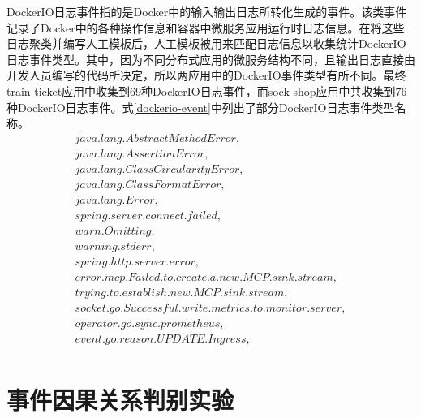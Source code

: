 DockerIO日志事件指的是Docker中的输入输出日志所转化生成的事件。该类事件记录了Docker\cite{boettiger2015introduction}中的各种操作信息和容器中微服务应用运行时日志信息。在将这些日志聚类并编写人工模板后，人工模板被用来匹配日志信息以收集统计DockerIO日志事件类型。其中，因为不同分布式应用的微服务结构不同，且输出日志直接由开发人员编写的代码所决定，所以两应用中的DockerIO事件类型有所不同。最终train-ticket应用中收集到69种DockerIO日志事件，而sock-shop应用中共收集到76种DockerIO日志事件。式\ref{dockerio-event}中列出了部分DockerIO日志事件类型名称。
\begin{equation}
    \begin{array}{l}
        java.lang.AbstractMethodError,\\
        java.lang.AssertionError,\\
        java.lang.ClassCircularityError,\\
        java.lang.ClassFormatError,\\
        java.lang.Error,\\
        spring.server.connect.failed,\\
        warn.Omitting,\\
        warning.stderr,\\
        spring.http.server.error,\\
        error.mcp.Failed.to.create.a.new.MCP.sink.stream,\\
        trying.to.establish.new.MCP.sink.stream,\\
        socket.go.Successful.write.metrics.to.monitor.server,\\
        operator.go.sync.prometheus,\\
        event.go.reason.UPDATE.Ingress,\\
    \end{array}
    \label{dockerio-event}
\end{equation}

\section{事件因果关系判别实验}


